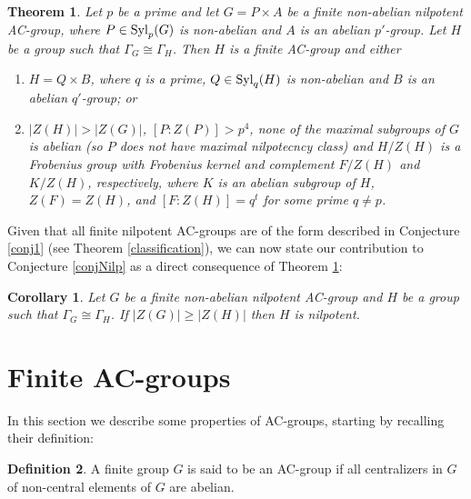 \documentclass[12pt]{amsart}
\theoremstyle{definition}
\newtheorem{definition}{Definition}[section]
\theoremstyle{remark}
\theoremstyle{plain}
\theoremstyle{plain}
\newtheorem{cor}[definition]{Corollary}
\theoremstyle{plain}
\theoremstyle{plain}
\theoremstyle{plain}
\newtheorem{theoremA}[]{Theorem}
\theoremstyle{remark}
\theoremstyle{remark}
\theoremstyle{definition}
\newcommand{\Syl}{\mathrm{Syl}}
\def \Z {\mathrm {Z}}
\def \Syl {\hbox {\rm Syl}}
\begin{document}
\begin{theoremA}\label{main}
Let $p$ be a prime and let $G = P \times A$ be a finite non-abelian nilpotent AC-group, where $P \in \Syl_p(G)$ is non-abelian and $A$ is an abelian $p'$-group. Let $H$ be a group such that $\Gamma_G \cong \Gamma_H$. Then $H$ is a finite AC-group and either 
\begin{enumerate}
\item $H = Q \times B$, where $q$ is a prime, $Q \in \Syl_q(H)$ is non-abelian and $B$ is an abelian $q'$-group; or
\item $|Z(H)| > |Z(G)|$, $[P \colon Z(P)] >p^4$, none of the maximal subgroups of $G$ is abelian (so $P$ does not have maximal nilpotecncy class) and $H/Z(H)$ is a Frobenius group with Frobenius kernel and complement $F/Z(H)$ and $K/Z(H)$, respectively, where $K$ is an abelian subgroup of $H$, $Z(F) = Z(H)$, and 
$[ F \colon Z(H)] = q^t$ for some prime $q \neq p$. %
\end{enumerate}
\end{theoremA}

Given that all finite nilpotent AC-groups are of the form described in Conjecture \ref{conj1} (see Theorem \ref{classification}), we can now state our contribution to Conjecture \ref{conjNilp} as a direct consequence of Theorem \ref{main}:
\begin{cor}
Let $G$ be a finite non-abelian nilpotent AC-group and $H$ be a group such that $\Gamma_G \cong \Gamma_H$. If $|Z(G)| \geq |Z(H)|$ then $H$ is nilpotent.
\end{cor}



\section{Finite AC-groups}
In this section we describe some properties of AC-groups, starting by recalling their definition:

\begin{definition}
A finite group $G$ is said to be an AC-group if all centralizers in $G$ of non-central elements of $G$ are abelian. 
\end{definition}
\end{document}

